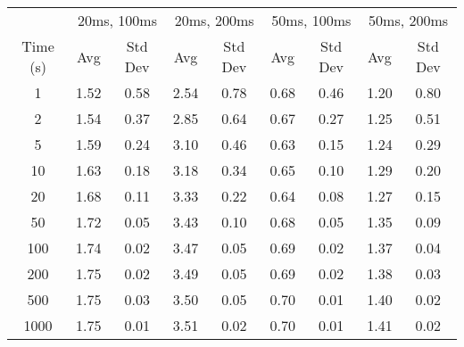 \begin{tabular}{c|cc|cc|cc|cc}
    & \multicolumn{2}{c|}{20ms, 100ms} & \multicolumn{2}{c|}{20ms, 200ms} & \multicolumn{2}{c|}{50ms, 100ms} & \multicolumn{2}{c}{50ms, 200ms}                                   \\
Time (s) & Avg                              & Std Dev                          & Avg                              & Std Dev                         & Avg  & Std Dev & Avg  & Std Dev \\
\midrule
1        & 1.52                             & 0.58                             & 2.54                             & 0.78                            & 0.68 & 0.46    & 1.20 & 0.80    \\
2        & 1.54                             & 0.37                             & 2.85                             & 0.64                            & 0.67 & 0.27    & 1.25 & 0.51    \\
5        & 1.59                             & 0.24                             & 3.10                             & 0.46                            & 0.63 & 0.15    & 1.24 & 0.29    \\
10       & 1.63                             & 0.18                             & 3.18                             & 0.34                            & 0.65 & 0.10    & 1.29 & 0.20    \\
20       & 1.68                             & 0.11                             & 3.33                             & 0.22                            & 0.64 & 0.08    & 1.27 & 0.15    \\
50       & 1.72                             & 0.05                             & 3.43                             & 0.10                            & 0.68 & 0.05    & 1.35 & 0.09    \\
100      & 1.74                             & 0.02                             & 3.47                             & 0.05                            & 0.69 & 0.02    & 1.37 & 0.04    \\
200      & 1.75                             & 0.02                             & 3.49                             & 0.05                            & 0.69 & 0.02    & 1.38 & 0.03    \\
500      & 1.75                             & 0.03                             & 3.50                             & 0.05                            & 0.70 & 0.01    & 1.40 & 0.02    \\
1000     & 1.75                             & 0.01                             & 3.51                             & 0.02                            & 0.70 & 0.01    & 1.41 & 0.02    \\
\end{tabular}